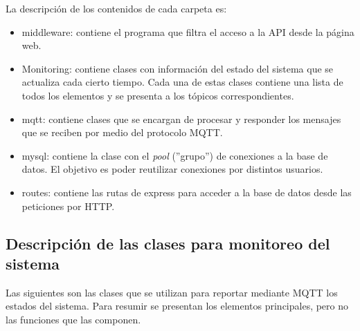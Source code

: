 La descripción de los contenidos de cada carpeta es:
\begin{itemize}
\item middleware: contiene el programa que filtra el acceso a la API desde  la página web.
\item Monitoring: contiene clases con información del estado del sistema que se actualiza cada cierto tiempo. Cada una de estas clases contiene una lista de todos los elementos y se presenta a los tópicos correspondientes.
\item mqtt: contiene clases que se encargan de procesar y responder los mensajes que se reciben por medio del protocolo MQTT.
\item mysql: contiene la clase con el \textit{pool} (''grupo'') de conexiones a la base de datos. El objetivo es poder reutilizar conexiones por distintos usuarios.
\item routes: contiene las rutas de express para acceder a la base de datos desde las peticiones por HTTP.
\end{itemize}

\pagebreak
\subsection{Descripción de las clases para monitoreo del sistema}

Las siguientes son las clases que se utilizan para reportar mediante MQTT los estados del sistema. Para resumir se presentan los elementos principales, pero no las funciones que las componen.

